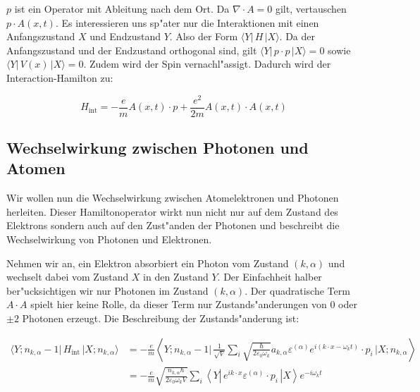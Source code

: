 $p$ ist ein Operator mit Ableitung nach dem Ort. Da $\nabla \cdot A = 0$ gilt, vertauschen $p \cdot A(x, t)$. Es interessieren uns sp"ater nur die Interaktionen mit einen Anfangszustand $X$ und Endzustand $Y$. Also der Form $\langle Y| \, H \, |X \rangle$. Da der Anfangszustand und der Endzustand orthogonal sind, gilt $\langle Y| \, p \cdot p \, |X \rangle = 0$ sowie $\langle Y| \, V(x) \, |X \rangle = 0$. Zudem wird der Spin vernachl"assigt. Dadurch wird der Interaction-Hamilton zu:

\begin{equation*}
H_{\text{int}} = -\frac{e}{m} A(x, t) \cdot p + \frac{e^2}{2m}A(x, t) \cdot A(x, t)
\end{equation*}

\subsection{Wechselwirkung zwischen Photonen und Atomen}

Wir wollen nun die Wechselwirkung zwischen Atomelektronen und Photonen herleiten. Dieser Hamiltonoperator wirkt nun nicht nur auf dem Zustand des Elektrons sondern auch auf den Zust"anden der Photonen und beschreibt die Wechselwirkung von Photonen und Elektronen.

Nehmen wir an, ein Elektron absorbiert ein Photon vom Zustand $(k,\alpha)$ und wechselt dabei vom Zustand $X$ in den Zustand $Y$. Der Einfachheit halber ber"ucksichtigen wir nur Photonen im Zustand $(k,\alpha)$. Der quadratische Term $A \cdot A$ spielt hier keine Rolle, da dieser Term nur Zustands"anderungen von $0$ oder $\pm 2$ Photonen erzeugt. Die Beschreibung der Zustands"anderung ist:

\begin{equation} \label{fq:absorbtion}
\begin{split}
\langle Y; n_{k,\alpha} - 1 |\, H_{\text{int}} \,| X; n_{k,\alpha} \rangle &=
 -\frac{e}{m} \left\langle Y; n_{k,\alpha} - 1 \biggl| 
 \, \frac{1}{\sqrt{V}} \sum_i \sqrt{\frac{\hbar}{2 \varepsilon_0 \omega_k}}a_{k,\alpha} \varepsilon^{(\alpha)} e^{i(k \cdot x-\omega_k t)} \cdot p_i \,
\biggl| X; n_{k,\alpha} \right\rangle\\
&= -\frac{e}{m} \sqrt{\frac{n_{k,\alpha} \hbar}{2 \varepsilon_0 \omega_k V}} \sum_i \left\langle Y \left|
\, e^{ik \cdot x} \varepsilon^{(\alpha)} \cdot p_i \,
\right| X \right\rangle e^{-i\omega_k t}
\end{split}
\end{equation}

